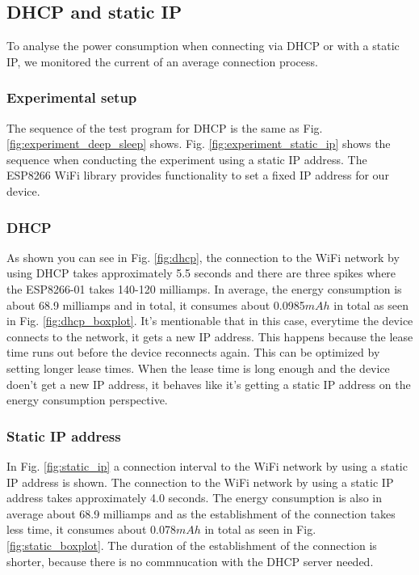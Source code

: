 \subsection{DHCP and static IP}
To analyse the power consumption when connecting via DHCP or with a static IP, we monitored the current of an average connection process.\\

\subsubsection{Experimental setup}
The sequence of the test program for DHCP is the same as Fig. \ref{fig:experiment_deep_sleep} shows.
Fig. \ref{fig:experiment_static_ip} shows the sequence when conducting the experiment using a static IP address.
The ESP8266 WiFi library provides functionality to set a fixed IP address for our device.\\

\subsubsection{DHCP}
As shown you can see in Fig. \ref{fig:dhcp}, the connection to the WiFi network by using DHCP takes approximately 5.5 seconds and there are three spikes where the ESP8266-01 takes 140-120 milliamps.
In average, the energy consumption is about 68.9 milliamps and in total, it consumes about 0.0985$mAh$ in total as seen in Fig. \ref{fig:dhcp_boxplot}.
It's mentionable that in this case, everytime the device connects to the network, it gets a new IP address. This happens because the lease time runs out before the device reconnects again.
This can be optimized by setting longer lease times. When the lease time is long enough and the device doen't get a new IP address, it behaves like it's getting a static IP address on the energy consumption perspective.\\

\subsubsection{Static IP address}
In Fig. \ref{fig:static_ip} a connection interval to the WiFi network by using a static IP address is shown. The connection to the WiFi network by using a static IP address takes approximately 4.0 seconds. 
The energy consumption is also in average about 68.9 milliamps and as the establishment of the connection takes less time, it consumes about 0.078$mAh$ in total as seen in Fig. \ref{fig:static_boxplot}.
The duration of the establishment of the connection is shorter, because there is no commnucation with the DHCP server needed.



